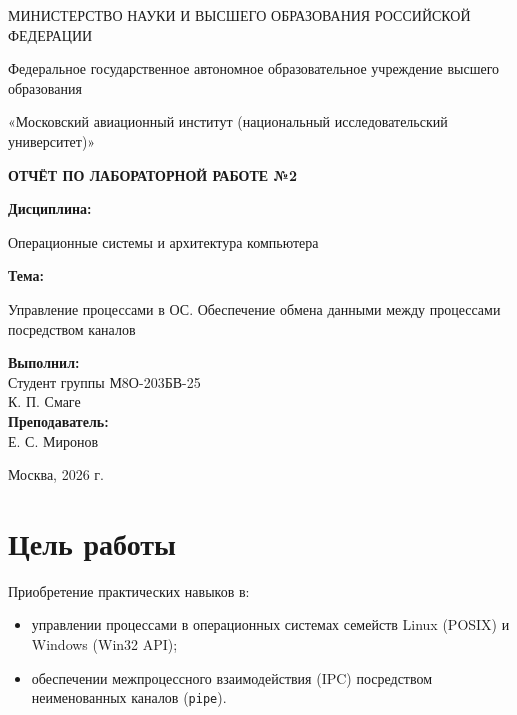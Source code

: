 \documentclass[11pt, a4paper]{article}
\begin{document}
\begin{titlepage}
    \centering
    {\small МИНИСТЕРСТВО НАУКИ И ВЫСШЕГО ОБРАЗОВАНИЯ РОССИЙСКОЙ ФЕДЕРАЦИИ\par}
    \vspace{0.3cm}
    {\small Федеральное государственное автономное образовательное учреждение высшего образования\par}
    {\small «Московский авиационный институт (национальный исследовательский университет)»\par}
    
    \vspace{4cm}
    {\Large \textbf{ОТЧЁТ ПО ЛАБОРАТОРНОЙ РАБОТЕ №2}\par}
    
    \vspace{1.2cm}
    {\large \textbf{Дисциплина:}\par}
    {\large Операционные системы и архитектура компьютера\par}
    
    \vspace{0.8cm}
    {\large \textbf{Тема:}\par}
    {\large Управление процессами в ОС. Обеспечение обмена данными между процессами посредством каналов\par}
    
    \vspace{3.5cm}
    \begin{flushright}
        \begin{minipage}{0.48\textwidth}
            \textbf{Выполнил:}\\
            Студент группы М8О-203БВ-25\\
            К. П. Смаге\\[0.8cm]
            \textbf{Преподаватель:}\\
            Е. С. Миронов\\
        \end{minipage}
    \end{flushright}
    
    \vfill
    {\large Москва, 2026 г.\par}
\end{titlepage}

\section{Цель работы}
Приобретение практических навыков в:
\begin{itemize}
    \item управлении процессами в операционных системах семейств Linux (POSIX) и Windows (Win32 API);
    \item обеспечении межпроцессного взаимодействия (IPC) посредством неименованных каналов (\texttt{pipe}).
\end{itemize}
\end{document}
